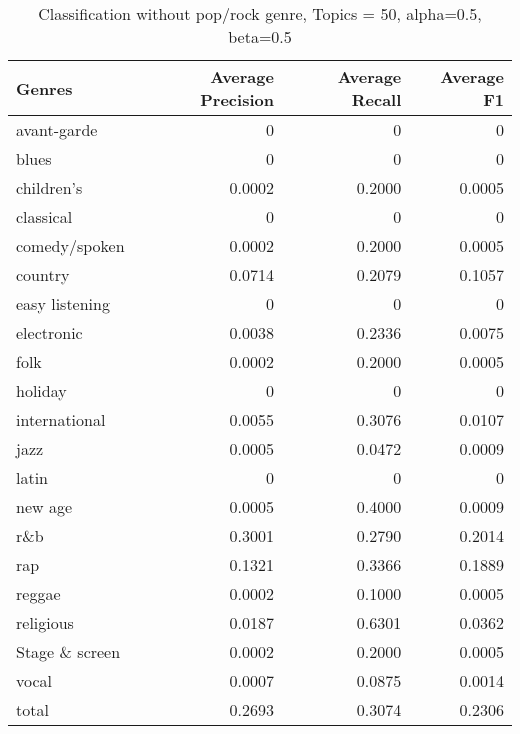 \begin{table}[h!]
\begin{tabular}{|l|r|r|r|}

\hline
\textbf{Genres} &  \textbf{Average Precision} & \textbf{Average Recall} & \textbf{Average F1} \\
\hline
avant-garde	&	0 &	0 &	0\\
blues		&	0 &	0 &	0\\
children's	&	0.0002 &	0.2000 &	0.0005\\
classical	&	0 &	0 &	0\\
comedy/spoken	&	0.0002 &	0.2000 &	0.0005\\
country		&	0.0714 &	0.2079 &	0.1057\\
easy listening	&	0 &	0 &	0\\
electronic	&	0.0038 &	0.2336 &	0.0075\\
folk		&	0.0002 &	0.2000 &	0.0005\\
holiday		&	0 & 	0 &	0\\
international	&	0.0055 &	0.3076 &	0.0107\\
jazz		&	0.0005 &	0.0472 &	0.0009\\
latin		&	0 &	0 &	0\\
new age		&	0.0005 &	0.4000 &	0.0009\\
r\&b		&	0.3001 & 	0.2790 &	0.2014\\
rap		&	0.1321 &	0.3366 &	0.1889\\
reggae		&	0.0002 &	0.1000 &	0.0005\\
religious	&	0.0187 &	0.6301 &	0.0362\\
Stage \& screen	&	0.0002 &	0.2000 &	0.0005\\
vocal		&	0.0007 &	0.0875 &	0.0014\\
total		&	0.2693 &	0.3074 &	0.2306\\
\hline
\end{tabular}
\caption{Classification without pop/rock genre, Topics = 50, alpha=0.5, beta=0.5}
\end{table}